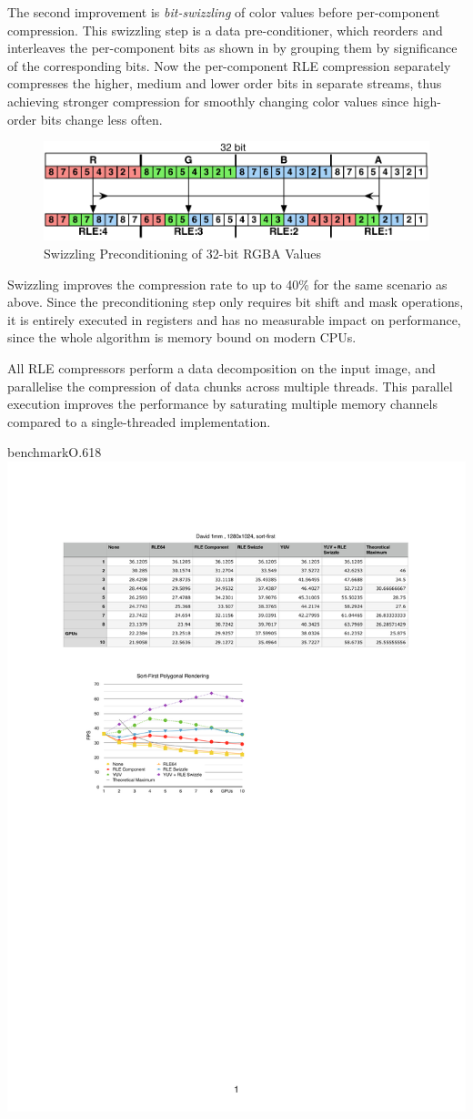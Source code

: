 The second improvement is {\em bit-swizzling} of color values before
per-component compression. This swizzling step is a data pre-conditioner, which
reorders and interleaves the per-component bits as shown in  by
grouping them by significance of the corresponding bits. Now the per-component
RLE compression separately compresses the higher, medium and lower order bits
in separate streams, thus achieving stronger compression for smoothly changing
color values since high-order bits change less often.

\begin{figure}[h!t]
  \centering
  \includegraphics[width=\textwidth]{images/swizzle}
  \caption{Swizzling Preconditioning of 32-bit RGBA Values}
  \label{fSwizzle}
\end{figure}

Swizzling improves the compression rate to up to 40\% for the same scenario as
above. Since the preconditioning step only requires bit shift and mask
operations, it is entirely executed in registers and has no measurable
impact on performance, since the whole algorithm is memory bound on modern CPUs.

All RLE compressors perform a data decomposition on the input image, and
parallelise the compression of data chunks across multiple threads. This
parallel execution improves the performance by saturating multiple memory
channels compared to a single-threaded implementation.

\begin{wrapfloat}{benchmark}{O}{.618\textwidth}
  \includegraphics[width=.618\textwidth]{results/rle}
  \caption{Image Compression in Sort-First Polygonal Rendering}
  \label{rRLE}
\end{wrapfloat}


